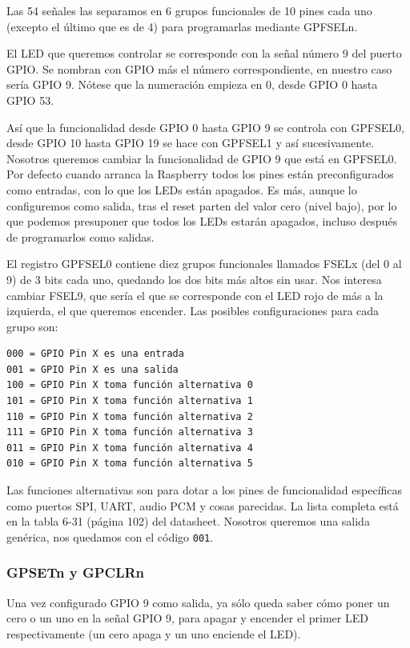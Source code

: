 Las 54 señales las separamos en 6
grupos funcionales de 10 pines cada uno (excepto el último
que es de 4) para programarlas mediante GPFSELn.

El LED que queremos controlar se corresponde con la señal número 9 del puerto GPIO.
Se nombran con GPIO más el número correspondiente, en nuestro caso sería GPIO 9. Nótese
que la numeración empieza en 0, desde GPIO 0 hasta GPIO 53.

Así que la funcionalidad desde GPIO 0 hasta GPIO 9 se controla con
GPFSEL0, desde GPIO 10 hasta GPIO 19 se hace con GPFSEL1 y así
sucesivamente. Nosotros queremos cambiar la funcionalidad de GPIO 9
que está en GPFSEL0. Por defecto cuando arranca la Raspberry
todos los pines están preconfigurados como entradas, con lo que los LEDs
están apagados. Es más, aunque lo configuremos como salida, tras el reset
parten del valor cero (nivel bajo), por lo que podemos presuponer que
todos los LEDs estarán apagados, incluso después de programarlos como salidas.

El registro GPFSEL0 contiene diez grupos funcionales
llamados FSELx (del 0 al 9) de 3 bits cada uno, quedando los dos bits
más altos sin usar. Nos interesa cambiar FSEL9, que sería el que se corresponde
con el LED rojo de más a la izquierda, el que queremos encender. Las posibles
configuraciones para cada grupo son:

\begin{lstlisting}
000 = GPIO Pin X es una entrada
001 = GPIO Pin X es una salida
100 = GPIO Pin X toma función alternativa 0
101 = GPIO Pin X toma función alternativa 1
110 = GPIO Pin X toma función alternativa 2
111 = GPIO Pin X toma función alternativa 3
011 = GPIO Pin X toma función alternativa 4
010 = GPIO Pin X toma función alternativa 5
\end{lstlisting}

Las funciones alternativas son para dotar a los pines de funcionalidad específicas
como puertos SPI, UART, audio PCM y cosas parecidas. La lista completa
está en la tabla 6-31 (página 102) del datasheet. Nosotros queremos una salida
genérica, nos quedamos con el código {\tt 001}.


\subsubsection{GPSETn y GPCLRn}

Una vez configurado GPIO 9 como salida, ya sólo queda saber cómo poner un cero o un
uno en la señal GPIO 9, para apagar y encender el primer LED respectivamente (un cero apaga
y un uno enciende el LED).

